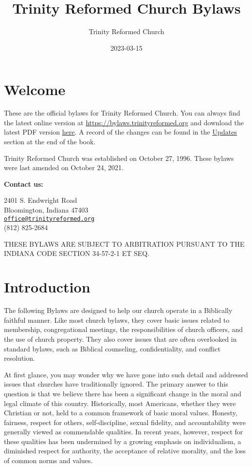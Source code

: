 \documentclass[
]{book}
\title{Trinity Reformed Church Bylaws}
\author{Trinity Reformed Church}
\date{2023-03-15}
\begin{document}
\maketitle

{
\hypersetup{linkcolor=}
\setcounter{tocdepth}{1}
\tableofcontents
}
\hypertarget{welcome}{%
\chapter*{Welcome}\label{welcome}}

These are the official bylaws for Trinity Reformed Church. You can always find the latest online version at \url{https://bylaws.trinityreformed.org} and download the latest PDF version \href{https://bylaws.trinityreformed.org/trc-bylaws.pdf}{here}. A record of the changes can be found in the \href{https://bylaws.trinityreformed.org/updates.html}{Updates} section at the end of the book.

Trinity Reformed Church was established on October 27, 1996. These bylaws were last amended on October 24, 2021.

\textbf{Contact us:}

2401 S. Endwright Road\\
Bloomington, Indiana 47403\\
\href{mailto:office@trinityreformed.org}{\nolinkurl{office@trinityreformed.org}}\\
(812) 825-2684

THESE BYLAWS ARE SUBJECT TO ARBITRATION PURSUANT TO THE INDIANA CODE SECTION 34-57-2-1 ET SEQ.

\mainmatter

\hypertarget{introduction}{%
\chapter{Introduction}\label{introduction}}

The following Bylaws are designed to help our church operate in a Biblically faithful manner. Like most church bylaws, they cover basic issues related to membership, congregational meetings, the responsibilities of church officers, and the use of church property. They also cover issues that are often overlooked in standard bylaws, such as Biblical counseling, confidentiality, and conflict resolution.

At first glance, you may wonder why we have gone into such detail and addressed issues that churches have traditionally ignored. The primary answer to this question is that we believe there has been a significant change in the moral and legal climate of this country. Historically, most Americans, whether they were Christian or not, held to a common framework of basic moral values. Honesty, fairness, respect for others, self-discipline, sexual fidelity, and accountability were generally viewed as commendable qualities. In recent years, however, respect for these qualities has been undermined by a growing emphasis on individualism, a diminished respect for authority, the acceptance of relative morality, and the loss of common norms and values.
\end{document}
